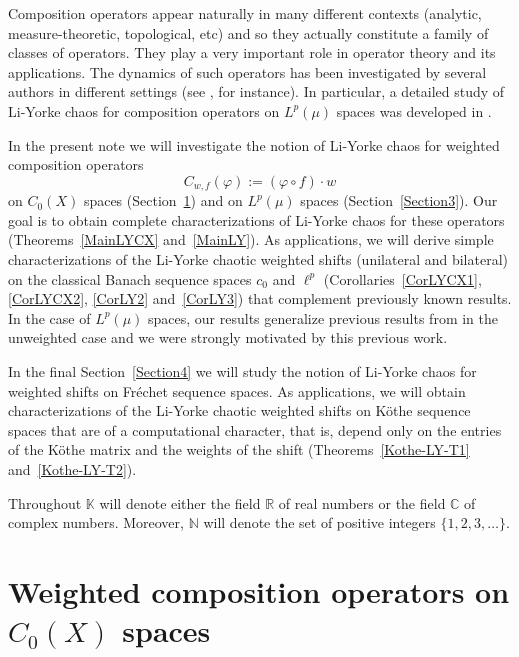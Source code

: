 \documentclass[12pt]{amsart}
\theoremstyle{theorem}
\theoremstyle{definition}
\theoremstyle{remark} \theoremstyle{question} \theoremstyle{example}
\newcommand{\N}{\mathbb{N}}
\newcommand{\R}{\mathbb{R}}
\newcommand{\C}{\mathbb{C}}
\newcommand{\K}{\mathbb{K}}
\begin{document}
Composition operators appear naturally in many different contexts (analytic, measure-theoretic, topological, etc) 
and so they actually constitute a family of classes of operators. 
They play a very important role in operator theory and its applications. 
The dynamics of such operators has been investigated by several authors in different settings 
(see \cite{BayDarPir18,LBerAMon95,BerBonMulPer13,BonKalPer21,BonDAnDarPia22,PBouJSha97,DAnDarMai21,
DAnDarMai22,UDarBPir21,EGalAMon04,KGro00,TKal07,TKal19,JSha93}, for instance). 
In particular, a detailed study of Li-Yorke chaos for composition operators on $L^p(\mu)$ spaces was developed in \cite{BerDarPir20}. 

\smallskip
In the present note we will investigate the notion of Li-Yorke chaos for weighted composition operators
\[
C_{w,f}(\varphi)\!:= (\varphi \circ f) \cdot w
\]
on $C_0(X)$ spaces (Section~\ref{Section2}) and on $L^p(\mu)$ spaces (Section~\ref{Section3}). 
Our goal is to obtain complete characterizations of Li-Yorke chaos for these operators (Theorems~\ref{MainLYCX} and~\ref{MainLY}). 
As applications, we will derive simple characterizations of the Li-Yorke chaotic weighted shifts (unilateral and bilateral) on the
classical Banach sequence spaces $c_0$ and $\ell^p$ (Corollaries~\ref{CorLYCX1}, \ref{CorLYCX2}, \ref{CorLY2} and~\ref{CorLY3}) 
that complement previously known results. 
In the case of $L^p(\mu)$ spaces, our results generalize previous results from \cite{BerDarPir20} in the unweighted case 
and we were strongly motivated by this previous work. 

\smallskip
In the final Section~\ref{Section4} we will study the notion of Li-Yorke chaos for weighted shifts on Fr\'echet sequence spaces.
As applications, we will obtain characterizations of the Li-Yorke chaotic weighted shifts on K\"othe sequence spaces 
that are of a computational character, that is, depend only on the entries of the K\"othe matrix and the weights of the shift
(Theorems~\ref{Kothe-LY-T1} and~\ref{Kothe-LY-T2}).

\smallskip
Throughout $\K$ will denote either the field $\R$ of real numbers or the field $\C$ of complex numbers.
Moreover, $\N$ will denote the set of positive integers $\{1,2,3,\ldots\}$.


\section{Weighted composition operators on $C_0(X)$ spaces}\label{Section2}
\end{document}
